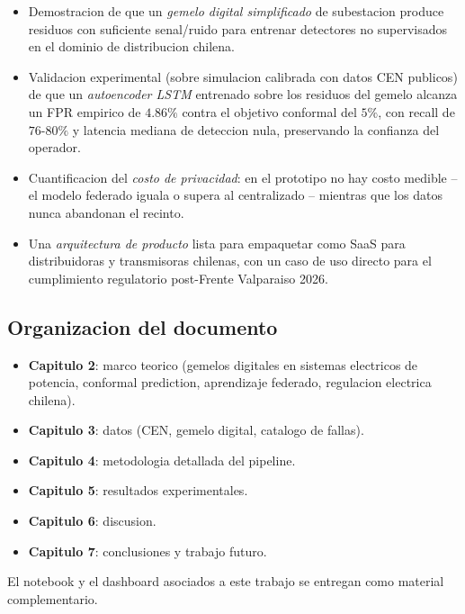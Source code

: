 \begin{itemize}[leftmargin=*,itemsep=2pt]
  \item Demostracion de que un \emph{gemelo digital simplificado} de
        subestacion produce residuos con suficiente senal/ruido para
        entrenar detectores no supervisados en el dominio de distribucion
        chilena.

  \item Validacion experimental (sobre simulacion calibrada con datos
        CEN publicos) de que un \emph{autoencoder LSTM} entrenado
        sobre los residuos del gemelo alcanza un FPR empirico de
        $4.86\%$ contra el objetivo conformal del $5\%$, con recall
        de $76$-$80\%$ y latencia mediana de deteccion nula,
        preservando la confianza del operador.

  \item Cuantificacion del \emph{costo de privacidad}: en el
        prototipo no hay costo medible -- el modelo federado iguala
        o supera al centralizado -- mientras que los datos nunca
        abandonan el recinto.

  \item Una \emph{arquitectura de producto} lista para empaquetar como
        SaaS para distribuidoras y transmisoras chilenas, con un caso
        de uso directo para el cumplimiento regulatorio post-Frente
        Valparaiso 2026.
\end{itemize}

\subsection{Organizacion del documento}

\begin{itemize}[leftmargin=*,itemsep=2pt]
  \item \textbf{Capitulo 2}: marco teorico (gemelos digitales en
        sistemas electricos de potencia, conformal prediction,
        aprendizaje federado, regulacion electrica chilena).
  \item \textbf{Capitulo 3}: datos (CEN, gemelo digital, catalogo
        de fallas).
  \item \textbf{Capitulo 4}: metodologia detallada del pipeline.
  \item \textbf{Capitulo 5}: resultados experimentales.
  \item \textbf{Capitulo 6}: discusion.
  \item \textbf{Capitulo 7}: conclusiones y trabajo futuro.
\end{itemize}

El notebook y el dashboard asociados a este trabajo se entregan como
material complementario.